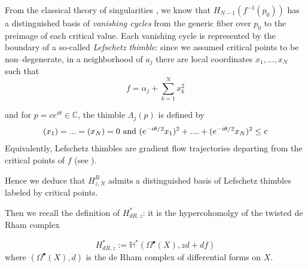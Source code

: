 \documentclass{article}
\let\Re\relax
\DeclareMathOperator{\Re}{Re}
\let\Im\relax
\DeclareMathOperator{\Im}{Im}
\theoremstyle{definition}
\newcommand{\C}{\mathbb{C}}
\theoremstyle{plain}
\begin{document}
\begin{center}
\end{center}

From the classical theory of singularities \cite[\textcolor{magenta}{add section; move to end of sentence}]{Arnold}, we know that $H_{N-1}(f^{-1}(p_0))$ has a distinguished basis of \textit{vanishing cycles} from the generic fiber over $p_0$ to the preimage of each critical value. Each vanishing cycle is represented by the boundary of a so-called \textit{Lefschetz thimble}: since we assumed critical points to be non--degenerate, in a neighborhood of $a_j$ there are local coordinates $x_1,...,x_N$ such that 
\[f=\alpha_j+\sum_{k=1}^N x_k^2\]

and for $p=c e^{i\theta}\in\C$, the thimble $\Lambda_j(p)$ is defined by 
\begin{align*}
    \Im(x_1)=...=\Im(x_N)=0 \text{ and } \Re(e^{-i\theta/2}x_1)^2+....+\Re(e^{-i\theta/2}x_N)^2\leq c
\end{align*}
Equivalently, Lefschetz thimbles are gradient flow trajectories departing from the critical points of $f$ (see \cite[page~10]{Witten}).

Hence we deduce that $H_{z, N}^B$ admits a distinguished basis of Lefschetz thimbles labeled by critical points.


Then we recall the definition of $H_{dR,z}^*$: it is the hypercohomolgy of the twisted de Rham complex 

\begin{equation*}
    H_{dR,z}^*:=\mathbb{H}^*( \Omega^\bullet(X), zd+df)
\end{equation*}
where $(\Omega^\bullet(X), d)$ is the de Rham complex of differential forms on $X$. 
\end{document}
